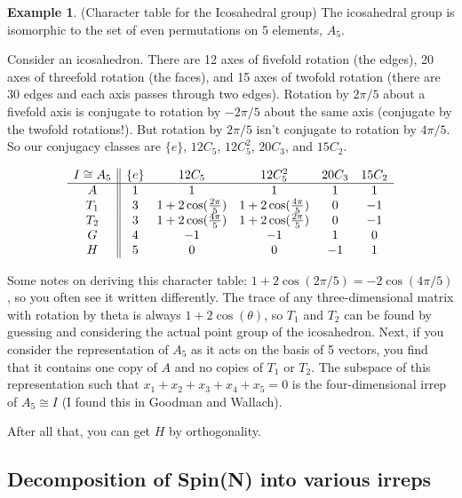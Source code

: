 \documentclass[12pt, letterpaper]{article}
\theoremstyle{definition} %
\newtheorem{ex}[thm]{Example}
\begin{document}
\begin{ex}
  (Character table for the Icosahedral group)
  The icosahedral group is isomorphic to the set of even permutations on 5 elements, $A_5$. 

  Consider an icosahedron. There are 12 axes of fivefold rotation (the edges),
  20 axes of threefold rotation (the faces), and 15 axes of twofold rotation (there are 30 edges and each axis passes through two edges).
  Rotation by $2\pi/5$ about a fivefold axis is conjugate to rotation by $-2\pi/5$ about the same axis (conjugate by the twofold rotations!).
  But rotation by $2\pi/5$ isn't conjugate  to rotation by $4\pi/5$. So our conjugacy classes are $\{e\}$, $12 C_5$, $12 C_5^2$, 
  $20 C_3$, and $15 C_2$. 

\begin{equation*}
 \begin{array}{c || c c c c c} 
   I\cong A_5& \{e\} & 12 C_5 & 12 C_5^2 & 20 C_3 & 15 C_2 \\ 
 \hline
 A & 1 & 1 & 1 & 1 & 1\\
 T_1 & 3 & 1+2\cos(\frac{2\pi}{5}) & 1+2\cos(\frac{4\pi}{5}) & 0 & -1 \\ 
 T_2 & 3 &1+2\cos(\frac{4\pi}{5}) & 1+2\cos(\frac{2\pi}{5})  & 0 & -1 \\ 
 G & 4 & -1 & -1 & 1 & 0 \\
 H & 5 & 0 & 0 & -1 & 1
\end{array}
\end{equation*}

Some notes on deriving this character table: $1+2\cos(2\pi/5)=-2\cos(4\pi/5)$, so you often see it written differently.
The trace of any three-dimensional matrix with rotation by theta is always $1+2\cos(\theta)$, so $T_1$ and $T_2$ can be 
found by guessing and considering the actual point group of the icosahedron. Next, if you consider the 
representation of $A_5$ as it acts on the basis of 5 vectors, you find that it contains one copy of $A$ and no copies of 
$T_1$ or $T_2$. The subspace of this representation such that $x_1+x_2+x_3+x_4+x_5=0$ is the four-dimensional irrep of $A_5\cong I$
(I found this in Goodman and Wallach). 

After all that, you can get $H$ by orthogonality.
\end{ex}

\subsection{Decomposition of Spin(N) into various irreps}
\end{document}
